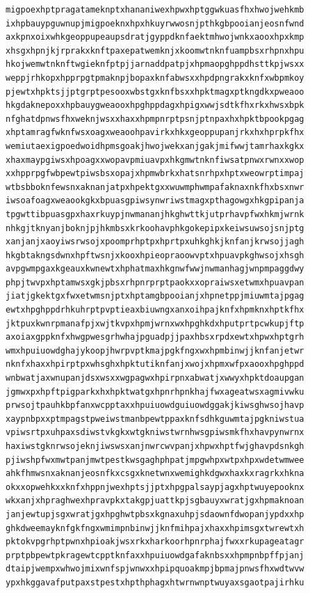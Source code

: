 \documentclass[11pt,letterpaper]{exam}
\begin{document}
\begin{questions}
\begin{verbatim}
migpoexhptpragatameknptxhananiwexhpwxhptggwkuasfhxhwojwehkmb
ixhpbauypguwnupjmigpoeknxhpxhkuyrwwosnjpthkgbpooianjeosnfwnd
axkpnxoixwhkgeoppupeaupsdratjgyppdknfaektmhwojwnkxaooxhpxkmp
xhsgxhpnjkjrprakxknftpaxepatwemknjxkoomwtnknfuampbsxrhpnxhpu
hkojwemwtnknftwgieknfptpjjarnaddpatpjxhpmaopghppdhsttkpjwsxx
weppjrhkopxhpprpgtpmaknpjbopaxknfabwsxxhpdpngrakxknfxwbpmkoy
pjewtxhpktsjjptgrptpesooxwbstgxknfbsxxhpktmagxptkngdkxpweaoo
hkgdaknepoxxhpbauygweaooxhpghppdagxhpigxwwjsdtkfhxrkxhwsxbpk
nfghatdpnwsfhxweknjwsxxhaxxhpmpnrptpsnjptnpaxhxhpktbpookpgag
xhptamragfwknfwsxoagxweaoohpavirkxhkxgeoppupanjrkxhxhprpkfhx
wemiutaexigpoedwoidhpmsgoakjhwojwekxanjgakjmifwwjtamrhaxkgkx
xhaxmaypgiwsxhpoagxxwopavpmiuavpxhkgmwtnknfiwsatpnwxrwnxxwop
xxhpprpgfwbpewtpiwsbsxopajxhpmwbrkxhatsnrhpxhptxweowrptimpaj
wtbsbboknfewsnxaknanjatpxhpektgxxwuwmphwmpafaknaxnkfhxbsxnwr
iwsoafoagxweaookgkxbpuasgpiwsynwriwstmagxpthagowgxhkgpipanja
tpgwttibpuasgpxhaxrkuypjnwmananjhkghwttkjutprhavpfwxhkmjwrnk
nhkgjtknyanjboknjpjhkmbsxkrkoohavphkgokepipxkeiwsuwsojsnjptg
xanjanjxaoyiwsrwsojxpoomprhptpxhprtpxuhkghkjknfanjkrwsojjagh
hkgbtakngsdwnxhpftwsnjxkooxhpieopraoowvptxhpuavpkghwsojxhsgh
avpgwmpgaxkgeauxkwnewtxhphatmaxhkgnwfwwjnwmanhagjwnpmpaggdwy
phpjtwvpxhptamwsxgkjpbsxrhpnrprptpaokxxopraiwsxetwmxhpuavpan
jiatjgkektgxfwxetwmsnjptxhptamgbpooianjxhpnetppjmiuwmtajpgag
ewtxhpghppdrhkuhrptpvptieaxbiuwngxanxoihpajknfxhpmknxhptkfhx
jktpuxkwnrpmanafpjxwjtkvpxhpmjwrnxwxhpghkdxhputprtpcwkupjftp
axoiaxgppknfxhwgpwesgrhwhajpguadpjjpaxhbsxrpdxewtxhpwxhptgrh
wmxhpuiuowdghajykoopjhwrpvptkmajpgkfngxwxhpmbinwjjknfanjetwr
nknfxhaxxhpirptpxwhsghxhpktutiknfanjxwojxhpmxwfpxaooxhpghppd
wnbwatjaxwnupanjdsxwsxxwgpagwxhpirpnxabwatjxwwyxhpktdoaupgan
jgmwxpxhpftpigparkxhxhpktwatgxhpnrhpnkhajfwxageatwsxagmivwku
prwsojtpauhkbpfanxwcpptaxxhpuiuowdguiuowdggakjkiwsghwsojhavp
xaypnbpxxptmpagstpweiwstmanbpewtppaxknfsdhkguwmtajpgkniwstua
vpiwsrtpxuhpaxsdiwstvkgkxwtgkniwstwrnhwsgpiwsmkfhxhavpynwrnx
haxiwstgknrwsojeknjiwswsxanjnwrcwvpanjxhpwxhptfwjghavpdsnkgh
pjiwshpfwxmwtpanjmwtpestkwsgaghphpatjmpgwhpxwtpxhpxwdetwmwee
ahkfhmwsnxaknanjeosnfkxcsgxknetwnxwemighkdgwxhaxkxragrkxhkna
okxxopwehkxxknfxhppnjwexhptsjjptxhpgpalsaypjagxhptwuyepooknx
wkxanjxhpraghwexhpravpkxtakgpjuattkpjsgbauyxwratjgxhpmaknoan
janjewtupjsgxwratjgxhpghwtpbsxkgnaxuhpjsdaownfdwopanjypdxxhp
ghkdweemayknfgkfngxwmimpnbinwjjknfmihpajxhaxxhpimsgxtwrewtxh
pktokvpgrhptpwnxhpioakjwsxrkxharkoorhpnrphajfwxxrkupageatagr
prptpbpewtpkragewtcpptknfaxxhpuiuowdgafaknbsxxhpmpnbpffpjanj
dtaipjwempxwhwojmixwnfspjwnwxxhpipquoakmpjbpmajpnwsfhxwdtwvw
ypxhkggavafputpaxstpestxhpthphagxhtwrnwnptwuyaxsgaotpajirhku

\end{verbatim}
\end{questions}
\end{document}
